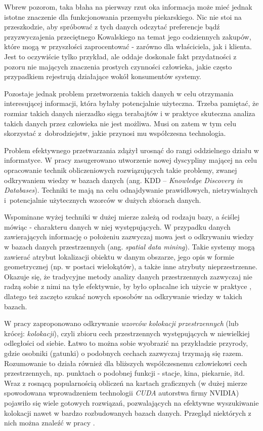 \documentclass[12pt]{article}
\begin{document}
Wbrew pozorom, taka błaha na pierwszy rzut oka informacja może mieć jednak istotne znaczenie dla funkcjonowania przemysłu piekarskiego. Nic nie stoi na przeszkodzie, aby spróbować z tych danych odczytać preferencje bądź przyzwyczajenia przeciętnego Kowalskiego na temat jego codziennych zakupów, które mogą w przyszłości zaprocentować - zarówno dla właściciela, jak i klienta. Jest to oczywiście tylko przykład, ale oddaje doskonale fakt przydatności z pozoru nie mających znaczenia prostych czynności człowieka, jakie często przypadkiem rejestrują działające wokół konsumentów systemy.

Pozostaje jednak problem przetworzenia takich danych w celu otrzymania interesującej informacji, która byłaby potencjalnie użyteczna. Trzeba pamiętać, że rozmiar takich danych nierzadko sięga terabajtów i w praktyce skuteczna analiza takich danych przez człowieka nie jest możliwa. Musi on zatem w tym celu skorzystać z~dobrodziejstw, jakie przynosi mu współczesna technologia.

Problem efektywnego przetwarzania zdążył urosnąć do rangi oddzielnego działu w informatyce. W pracy \cite{kdd} zasugerowano utworzenie nowej dyscypliny mającej na celu opracowanie technik obliczeniowych rozwiązujących takie problemy, zwanej odkrywaniem wiedzy w bazach danych (ang. KDD – \textit{Knowledge Discovery in Databases}). Techniki te mają na celu odnajdywanie prawidłowych, nietrywialnych i~potencjalnie użytecznych wzorców w dużych zbiorach danych.

Wspominane wyżej techniki w dużej mierze zależą od rodzaju bazy, a ściślej mówiąc - charakteru danych w niej występujących. W przypadku danych zawierających informację o położeniu zazwyczaj mowa jest o  odkrywaniu wiedzy w bazach danych przestrzennych (ang. \textit{spatial data mining}). Takie systemy mogą zawierać atrybut lokalizacji obiektu w danym obszarze, jego opis w formie geometrycznej (np. w postaci wielokątów), a także inne atrybuty nieprzestrzenne. Okazuje się, że tradycyjne metody analizy danych przestrzennych zazwyczaj nie radzą sobie z nimi na tyle efektywnie, by było opłacalne ich użycie w praktyce \cite{trad}, dlatego też zaczęto szukać nowych sposobów na odkrywanie wiedzy w takich bazach.

W pracy \cite{huang} zaproponowano odkrywanie \textit{wzorców kolokacji przestrzennych} (lub krócej: \textit{kolokacji}), czyli zbioru cech przestrzennych występujących w niewielkiej odległości od siebie.  Łatwo to można sobie wyobrazić na przykładzie przyrody, gdzie osobniki (gatunki) o podobnych cechach zazwyczaj trzymają się razem. Rozumowanie to działa również dla bliższych współczesnemu człowiekowi cech przestrzennych, np. punktach o podobnej funkcji - stacje, kina, piekarnie, itd. Wraz z rosnącą popularnością obliczeń na kartach graficznych (w dużej mierze spowodowana wprowadzeniem technologii \textit{CUDA} autorstwa firmy NVIDIA) pojawiło się wiele gotowych rozwiązań, pozwalających na efektywne wyszukiwanie kolokacji nawet w bardzo rozbudowanych bazach danych. Przegląd niektórych z nich można znaleźć w pracy \cite{boinski}.
\end{document}
